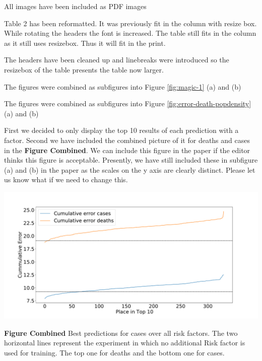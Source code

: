   {All images have been included as PDF images}


  { Table 2 has been reformatted. It was previously fit in the column
    with resize box. While rotating the headers the font is
    increased. The table still fits in the column as it still uses
    resizebox. Thus it will fit in the print.}

  { The headers have been cleaned up and linebreaks were introduced so
    the resizebox of the table presents the table now larger.} 

  {The figures were combined as subfigures into Figure \ref{fig:magic-1} (a) and (b)}


    {The figures were combined as subfigures into Figure \ref{fig:error-death-popdensity} (a) and (b)}


  {


First we decided to only display the top 10 results of each prediction
with a factor. Second we have included the combined picture of it for
deaths and cases in the {\bf Figure Combined}. We can include this
figure in the paper if the editor thinks this figure is acceptable. Presently, we have still included these in  subfigure
(a) and (b) in the paper as the scales on the y axis are
clearly distinct. Please let us know what if we need to change this.

{
        \centering
        \includegraphics[width=.9\textwidth]{images/predict/PlaceTop10_CasesAndDeathNEW2.pdf}
        
        {\bf Figure Combined} Best predictions for cases over all risk factors.
The two horizontal lines represent the experiment in which no additional Risk factor is used for training. The top one for deaths and the bottom one for cases.}        


}



